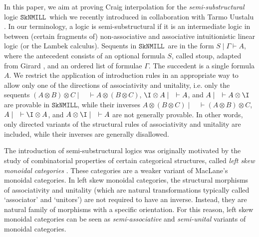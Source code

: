 \documentclass[sn-mathphys-num]{sn-jnl}%
\newcommand{\GG}{\Gamma}
\newcommand{\vd}{\vdash}
\newcommand{\ot}{\otimes}
\newcommand{\SkNMILL}{$\mathtt{SkNMILL}$}
\theoremstyle{thmstyleone}%
\theoremstyle{thmstyletwo}%
\theoremstyle{thmstylethree}%
\begin{document}
In this paper, we aim at proving Craig interpolation for the \emph{semi-substructural} logic \SkNMILL\ which we recently introduced in collaboration with Tarmo Uustalu \cite{UVW:protsn}.
In our terminology, a logic is semi-substructural if it is an intermediate logic in between (certain fragments of) non-associative and associative intuitionistic linear logic (or the Lambek calculus).
Sequents in \SkNMILL\ are in the form $S \mid \GG \vdash A$, where the antecedent consists of an optional formula $S$, called stoup, adapted from Girard \cite{girard:constructive:91}, and an ordered list of formulae $\GG$.
The succedent is a single formula $A$.
We restrict the application of introduction rules in an appropriate way to allow only one of the directions of associativity and unitality, i.e. only the sequents $(A \ot B)\ot C \mid \quad \vd A \ot (B \ot C)$, $\I \ot A \mid \quad \vd A$, and $A \mid \quad \vd A \ot \I$ are provable in \SkNMILL, while their inverses $A \ot (B \ot C) \mid \quad \vd (A \ot B) \ot C$, $A \mid \quad \vd \I \ot A$, and $A \ot \I \mid \quad \vd A$ are not generally provable.
In other words, only directed variants of the structural rules of associativity and unitality are included, while their inverses are generally disallowed.

The introduction of semi-substructural logics was originally motivated by the study of combinatorial properties of certain categorical structures, called \emph{left skew monoidal categories} \cite{szlachanyi:skew-monoidal:2012}.
These categories are a weaker variant of MacLane's monoidal categories.
In left skew monoidal categories, the structural morphisms of associativity and unitality (which are natural transformations typically called `associator' and `unitors') are not required to have an inverse. Instead, they are natural family of morphisms with a specific orientation.
For this reason, left skew monoidal categories can be seen as \emph{semi-associative} and \emph{semi-unital} variants of monoidal categories. 
\end{document}
